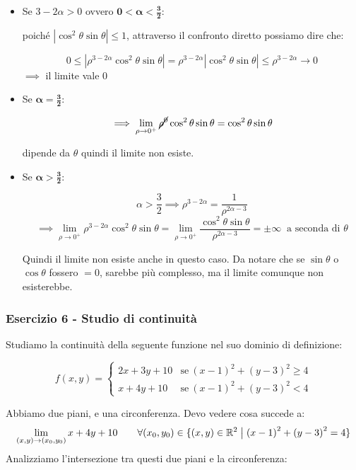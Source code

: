 \begin{itemize}
    \item Se \(3-2\alpha > 0\) ovvero \(\bm{0<\alpha < \frac{3}{2}}\):

          poiché \(\left\vert \cos^{2}\theta  \sin\theta  \right\vert \le 1\), attraverso il confronto diretto possiamo dire che:

          \[
              0 \le \left\vert\rho^{3-2\alpha}\cos^{2}\theta \sin\theta\right\vert = \rho^{3-2\alpha}\left\vert\cos^{2}\theta \sin\theta\right\vert \le \rho^{3-2\alpha} \to 0
          \]
          \(\implies \) il limite vale 0
    \item Se \(\bm{\alpha = \frac{3}{2}}\):

          \[
              \implies \lim_{\rho \to 0^+} \cancel{\rho^0} \cos^{2}\theta \sin\theta = \cos^{2}\theta \sin\theta
          \]

          dipende da \(\theta \) quindi il limite non esiste.
    \item Se \(\bm{\alpha > \frac{3}{2}}\):

    \[
        \alpha > \frac{3}{2} \implies \rho^{3-2\alpha} = \frac{1}{\rho^{2\alpha-3}}
    \]
    \[
        \implies \lim_{ \rho \to 0^{+} } \rho^{3-2\alpha} \cos^{2}\theta \sin\theta = \lim_{ \rho \to 0^{+} } \frac{\cos^{2}\theta \sin\theta}{\rho^{2\alpha-3}} = \pm \infty \ \text{ a seconda di } \theta
    \]

    Quindi il limite non esiste anche in questo caso. Da notare che se \(\sin\theta \) o \(\cos\theta \) fossero \(=0\), sarebbe più complesso, ma il limite comunque non esisterebbe.

\end{itemize}

\filbreak{}
\subsubsection*{Esercizio 6 {-} Studio di continuità}

Studiamo la continuità della seguente funzione nel suo dominio di definizione:

\[
    f(x,y)=
    \begin{cases}
        2x+3y+10 & \text{se}\ {(x-1)}^{2}+{(y-3)}^{2} \ge 4 \\
        x+4y+10  & \text{se}\ {(x-1)}^{2}+{(y-3)}^{2} < 4
    \end{cases}
\]

Abbiamo due piani, e una circonferenza. Devo vedere cosa succede a:
\[
    \lim_{ (x,y) \to (x_0,y_0) } x+4y+10 \qquad \forall (x_0,y_0) \in \{(x,y) \in \mathbb{R}^2 \;\big|\; {(x-1)}^{2}+{(y-3)}^{2} = 4\}
\]
Analizziamo l'intersezione tra questi due piani e la circonferenza:

